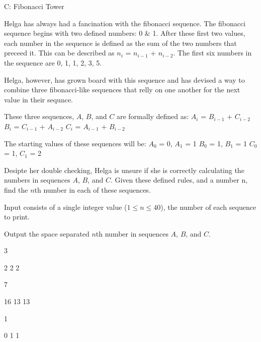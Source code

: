\begin{problem}{C: Fibonacci Tower}

Helga has always had a fancination with the fibonacci sequence. The fibonacci sequence begins with two defined numbers: 0 & 1. After these first two values, each number in the sequence is defined as the sum of the two numbers that preceed it. This can be described as $n_{i}$ = $n_{i-1}$ + $n_{i-2}$. The first six numbers in the sequence are 0, 1, 1, 2, 3, 5.

Helga, however, has grown board with this sequence and has devised a way to combine three fibonacci-like sequences that relly on one another for the next value in their sequnce.

These three sequences, $A$, $B$, and $C$ are formally defined as:
$A_{i}$ = $B_{i-1}$ + $C_{i-2}$
$B_{i}$ = $C_{i-1}$ + $A_{i-2}$
$C_{i}$ = $A_{i-1}$ + $B_{i-2}$

The starting values of these sequences will be:
$A_{0}$ = 0, $A_{1}$ = 1
$B_{0}$ = 1, $B_{1}$ = 1
$C_{0}$ = 1, $C_{1}$ = 2

Desipte her double checking, Helga is unsure if she is correctly calculating the numbers in sequences $A$, $B$, and $C$. Given these defined rules, and a number n, find the $n$th number in each of these sequences. 
\end{problem}

\begin{formalin}
Input consists of a single integer value ($1 \leq n \leq 40$), the number of each sequence to print.
\end{formalin}

\begin{formalout}
Output the space separated $n$th number in sequences $A$, $B$, and $C$.
\end{formalout}

\begin{datain}
3
\end{datain}
\begin{dataout}
2 2 2
\end{dataout}

\begin{datain}
7
\end{datain}
\begin{dataout}
16 13 13
\end{dataout}

\begin{datain}
1
\end{datain}
\begin{dataout}
0 1 1
\end{dataout}